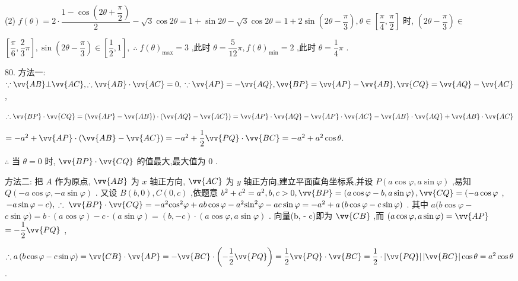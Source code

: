 (2) $f\left( \theta \right)  = 2 \cdot  \dfrac{1 - \cos \left( {{2\theta } + \dfrac{\pi }{2}}\right) }{2} - \sqrt{3}\cos {2\theta } = 1 + \sin {2\theta } - \sqrt{3}\cos {2\theta } = 1 + 2\sin \left( {{2\theta } - \dfrac{\pi }{3}}\right) ,\theta  \in  \left\lbrack  {\dfrac{\pi }{4},\dfrac{\pi }{2}}\right\rbrack$ 时, $\left( {{2\theta } - \dfrac{\pi }{3}}\right)  \in$

$\left\lbrack  {\dfrac{\pi }{6},\dfrac{2}{3}\pi }\right\rbrack  ,\sin \left( {{2\theta } - \dfrac{\pi }{3}}\right)  \in  \left\lbrack  {\dfrac{1}{2},1}\right\rbrack  ,\;\therefore \;f{\left( \theta \right) }_{\max } = 3$ ,此时 $\theta  = \dfrac{5}{12}\pi ,f{\left( \theta \right) }_{\min } = 2$ ,此时 $\theta  = \dfrac{1}{4}\pi$ .

80. 方法一: $\because \vv{AB}\bot \vv{AC},\therefore \vv{AB} \cdot  \vv{AC} = 0,\;\because \vv{AP} =  - \vv{AQ},\vv{BP} = \vv{AP} - \vv{AB},\vv{CQ} = \vv{AQ} - \vv{AC}$ ,

$\therefore \vv{BP} \cdot  \vv{CQ} = \left( {\vv{AP} - \vv{AB}}\right)  \cdot  \left( {\vv{AQ} - \vv{AC}}\right)  = \vv{AP} \cdot  \vv{AQ} - \vv{AP} \cdot  \vv{AC} - \vv{AB} \cdot  \vv{AQ} + \vv{AB} \cdot  \vv{AC}$

$=  - {a}^{2} + \vv{AP} \cdot  \left( {\vv{AB} - \vv{AC}}\right)  =  - {a}^{2} + \dfrac{1}{2}\vv{PQ} \cdot  \vv{BC} =  - {a}^{2} + {a}^{2}\cos \theta .$

$\therefore$ 当 $\theta  = 0$ 时, $\vv{BP} \cdot  \vv{CQ}$ 的值最大,最大值为 0 .

方法二: 把 $A$ 作为原点, $\vv{AB}$ 为 $x$ 轴正方向, $\vv{AC}$ 为 $y$ 轴正方向,建立平面直角坐标系,并设 $P\left( {a\cos \varphi ,a\sin \varphi }\right)$ ,易知 $Q\left( {-a\cos \varphi , - a\sin \varphi }\right)$ . 又设 $B\left( {b,0}\right) ,C\left( {0,c}\right)$ ,依题意 ${b}^{2} + {c}^{2} = {a}^{2},b,c > 0,\vv{BP} = \left( {a\cos \varphi  - b,a\sin \varphi }\right) ,\vv{CQ} = ( - a\cos \varphi$ , $- a\sin \varphi  - c),\;\therefore \;\vv{BP} \cdot  \vv{CQ} =  - {a}^{2}{\cos }^{2}\varphi  + {ab}\cos \varphi  - {a}^{2}{\sin }^{2}\varphi  - {ac}\sin \varphi  =  - {a}^{2} + a\left( {b\cos \varphi  - c\sin \varphi }\right)$ . 其中 $a(b\cos \varphi  -$  $c\sin \varphi ) = b \cdot  \left( {a\cos \varphi }\right)  - c \cdot  \left( {a\sin \varphi }\right)  = \left( {b, - c}\right)  \cdot  \left( {a\cos \varphi ,a\sin \varphi }\right)$ . 向量(b, - c)即为 $\vv{CB}$ ,而 $\left( {a\cos \varphi ,a\sin \varphi }\right)  = \vv{AP}$  $=  - \dfrac{1}{2}\vv{PQ}$ ,

$\therefore a\left( {b\cos \varphi  - c\sin \varphi }\right)  = \vv{CB} \cdot  \vv{AP} =  - \vv{BC} \cdot  \left( {-\dfrac{1}{2}\vv{PQ}}\right)  = \dfrac{1}{2}\vv{PQ} \cdot  \vv{BC} = \dfrac{1}{2} \cdot  \left| \vv{PQ}\right| \left| \vv{BC}\right| \cos \theta  = {a}^{2}\cos \theta$ .

